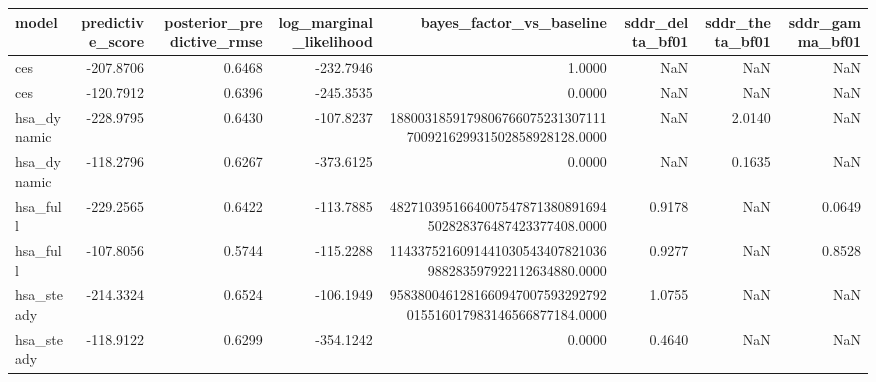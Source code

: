 \begin{tabular}{lrrrrrrr}
\toprule
model & predictive\_score & posterior\_predictive\_rmse & log\_marginal\_likelihood & bayes\_factor\_vs\_baseline & sddr\_delta\_bf01 & sddr\_theta\_bf01 & sddr\_gamma\_bf01 \\
\midrule
ces & -207.8706 & 0.6468 & -232.7946 & 1.0000 & NaN & NaN & NaN \\
ces & -120.7912 & 0.6396 & -245.3535 & 0.0000 & NaN & NaN & NaN \\
hsa\_dynamic & -228.9795 & 0.6430 & -107.8237 & 1880031859179806766075231307111700921629931502858928128.0000 & NaN & 2.0140 & NaN \\
hsa\_dynamic & -118.2796 & 0.6267 & -373.6125 & 0.0000 & NaN & 0.1635 & NaN \\
hsa\_full & -229.2565 & 0.6422 & -113.7885 & 4827103951664007547871380891694502828376487423377408.0000 & 0.9178 & NaN & 0.0649 \\
hsa\_full & -107.8056 & 0.5744 & -115.2288 & 1143375216091441030543407821036988283597922112634880.0000 & 0.9277 & NaN & 0.8528 \\
hsa\_steady & -214.3324 & 0.6524 & -106.1949 & 9583800461281660947007593292792015516017983146566877184.0000 & 1.0755 & NaN & NaN \\
hsa\_steady & -118.9122 & 0.6299 & -354.1242 & 0.0000 & 0.4640 & NaN & NaN \\
\bottomrule
\end{tabular}
